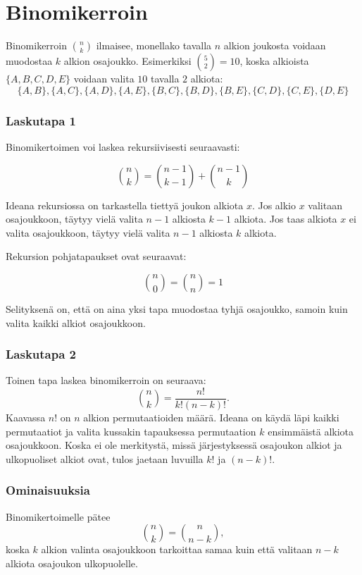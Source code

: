 \section{Binomikerroin}


Binomikerroin ${n \choose k}$ ilmaisee,
monellako tavalla $n$ alkion joukosta
voidaan muodostaa $k$ alkion osajoukko.
Esimerkiksi ${5 \choose 2}=10$,
koska alkioista $\{A,B,C,D,E\}$
voidaan valita $10$ tavalla $2$ alkiota:
\[ \{A,B\}, \{A,C\}, \{A,D\}, \{A,E\}, \{B,C\}, 
\{B,D\}, \{B,E\}, \{C,D\}, \{C,E\}, \{D,E\} \]

\subsubsection{Laskutapa 1}

Binomikertoimen voi laskea rekursiivisesti seuraavasti:

\[
{n \choose k}  =  {n-1 \choose k-1} + {n-1 \choose k}
\]

Ideana rekursiossa on tarkastella tiettyä
joukon alkiota $x$.
Jos alkio $x$ valitaan osajoukkoon,
täytyy vielä valita $n-1$ alkiosta $k-1$ alkiota.
Jos taas alkiota $x$ ei valita osajoukkoon,
täytyy vielä valita $n-1$ alkiosta $k$ alkiota.

Rekursion pohjatapaukset ovat seuraavat:

\[
{n \choose 0}  =  {n \choose n} = 1
\]

Selityksenä on, että on aina yksi tapa
muodostaa tyhjä osajoukko,
samoin kuin valita kaikki alkiot osajoukkoon.

\subsubsection{Laskutapa 2}

Toinen tapa laskea binomikerroin on seuraava:
\[
{n \choose k}  =  \frac{n!}{k!(n-k)!}.
\]
Kaavassa $n!$ on $n$ alkion permutaatioiden määrä.
Ideana on käydä läpi kaikki permutaatiot
ja valita kussakin tapauksessa
permutaation $k$ ensimmäistä alkiota osajoukkoon.
Koska ei ole merkitystä,
missä järjestyksessä osajoukon alkiot
ja ulkopuoliset alkiot ovat,
tulos jaetaan luvuilla $k!$ ja $(n-k)!$.

\subsubsection{Ominaisuuksia}

Binomikertoimelle pätee
\[
{n \choose k}  =  {n \choose n-k},
\]
koska $k$ alkion valinta osajoukkoon
tarkoittaa samaa kuin että valitaan
$n-k$ alkiota osajoukon ulkopuolelle.


